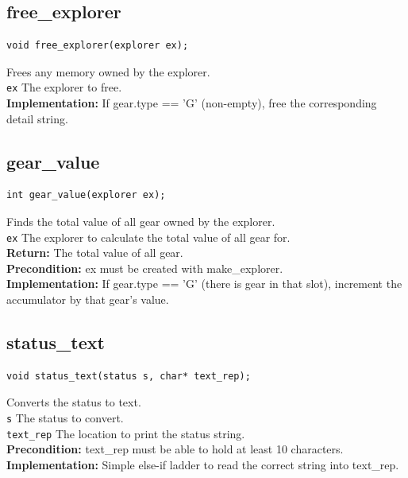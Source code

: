 \documentclass{article}
\begin{document}
\subsection{free\_explorer}
\begin{lstlisting}
void free_explorer(explorer ex);
\end{lstlisting}


  Frees any memory owned by the explorer.\\ 
 \texttt{ex} The explorer to free.\\ 
 
 
 \textbf{Implementation:}
If gear.type == 'G' (non-empty), free the corresponding detail string.
 

\subsection{gear\_value}
\begin{lstlisting}
int gear_value(explorer ex);
\end{lstlisting}


  Finds the total value of all gear owned by the explorer.\\ 
 \texttt{ex} The explorer to calculate the total value of all gear for.\\ 
 \textbf{Return:} The total value of all gear.\\ 
 \textbf{Precondition:}  ex must be created with  make\_explorer.\\ 
 
 
 \textbf{Implementation:}
If gear.type == 'G' (there is gear in that slot),
increment the accumulator by that gear's value.
 

\subsection{status\_text}
\begin{lstlisting}
void status_text(status s, char* text_rep);
\end{lstlisting}


  Converts the status to text.\\ 
 \texttt{s} The status to convert.\\ 
 \texttt{text\_rep} The location to print the status string.\\ 
 \textbf{Precondition:}  text\_rep must be able to hold at least 10 characters.\\ 
 
 
 \textbf{Implementation:}
Simple else-if ladder to read the correct string
into  text\_rep.
\end{document}
